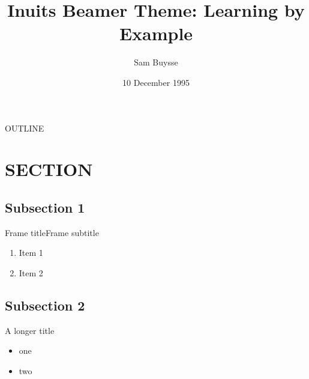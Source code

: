 \documentclass[aspectratio=169]{beamer}
\title{Inuits Beamer Theme: Learning by Example}
\date{10 December 1995}
\author{Sam Buysse}
\begin{document}
\begin{frame}
    \titlepage
\end{frame}

\begin{frame}[plain]{OUTLINE}
    \addtocounter{framenumber}{-1}
    \tableofcontents
\end{frame}

\section{SECTION}
\begin{frame}[plain]
    \sectionpage
\end{frame}

\subsection{Subsection 1}
\begin{frame}{Frame title}{Frame subtitle}
    \begin{enumerate}
        \item Item 1
        \item Item 2
    \end{enumerate}
\end{frame}

\subsection{Subsection 2}
\begin{frame}{A longer title}
    \begin{itemize}
        \item one
        \item two
    \end{itemize}
\end{frame}

\begin{frame}[plain]
    \endcard
\end{frame}
\end{document}
